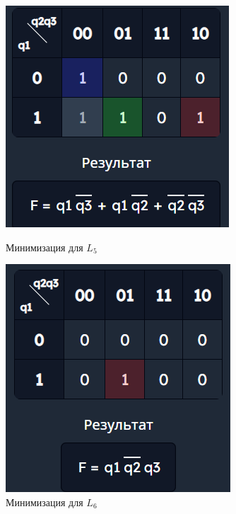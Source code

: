 \documentclass[11pt,a4paper,final]{article} %
\begin{document}
\begin{figure}[ht]
	\vspace{0.5cm}
	
	\begin{minipage}{0.45\textwidth}
		\centering
		\includegraphics[width=\linewidth]{img/L5.png}
		\caption{Минимизация для $L_5$}
		\label{fig:L5}
	\end{minipage}\hfill
	\begin{minipage}{0.45\textwidth}
		\centering
		\includegraphics[width=\linewidth]{img/L6.png}
		\caption{Минимизация для $L_6$}
		\label{fig:L6}
	\end{minipage}
\end{figure}
\end{document}
